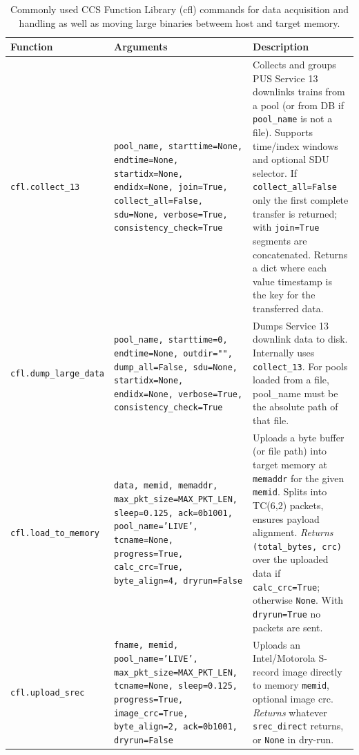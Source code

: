 \begin{table}[h!]
\centering
\renewcommand{\arraystretch}{1.3}
\setlength{\tabcolsep}{8pt}
\begin{tabular}{p{4cm} p{5cm} p{6cm}}
\hline
\textbf{Function} & \textbf{Arguments} & \textbf{Description} \\ 
\hline

\texttt{cfl.collect\_13} & \texttt{pool\_name, starttime=None, endtime=None, startidx=None, endidx=None, join=True, collect\_all=False, sdu=None, verbose=True, consistency\_check=True} &
Collects and groups PUS Service 13 downlinks trains from a pool (or from DB if \texttt{pool\_name} is not a file).  
Supports time/index windows and optional SDU selector.  
If \texttt{collect\_all=False} only the first complete transfer is returned; with \texttt{join=True} segments are concatenated.  
Returns a dict where each value timestamp is the key for the transferred data. \\

\texttt{cfl.dump\_large\_data} & \texttt{pool\_name, starttime=0, endtime=None, outdir="", dump\_all=False, sdu=None, startidx=None, endidx=None, verbose=True, consistency\_check=True} &
Dumps Service 13 downlink data to disk. Internally uses \texttt{collect\_13}. 
For pools loaded from a file, pool\_name must be the absolute path of that file. \\

\texttt{cfl.load\_to\_memory} & \texttt{data, memid, memaddr, max\_pkt\_size=MAX\_PKT\_LEN, sleep=0.125, ack=0b1001, pool\_name='LIVE', tcname=None, progress=True, calc\_crc=True, byte\_align=4, dryrun=False} &
Uploads a byte buffer (or file path) into target memory at \texttt{memaddr} for the given \texttt{memid}.  
Splits into TC(6,2) packets, ensures payload alignment.  
\emph{Returns} \texttt{(total\_bytes, crc)} over the uploaded data if \texttt{calc\_crc=True}; otherwise \texttt{None}. With \texttt{dryrun=True} no packets are sent. \\

\texttt{cfl.upload\_srec} & \texttt{fname, memid, pool\_name='LIVE', max\_pkt\_size=MAX\_PKT\_LEN, tcname=None, sleep=0.125, progress=True, image\_crc=True, byte\_align=2, ack=0b1001, dryrun=False} &
Uploads an Intel/Motorola S-record image directly to memory \texttt{memid}, optional image crc.  
\emph{Returns} whatever \texttt{srec\_direct} returns, or \texttt{None} in dry-run. \\


\hline
\end{tabular}
\caption{Commonly used CCS Function Library (cfl) commands for data acquisition and handling as well as moving large binaries betweem host and target memory.}
\end{table}



